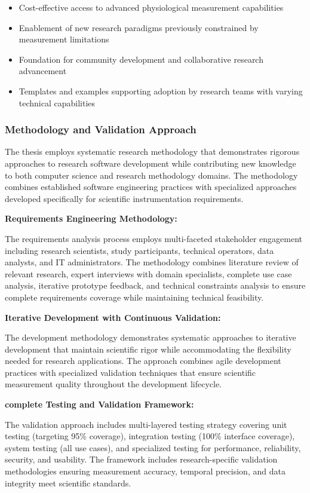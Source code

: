 \documentclass[11pt,a4paper]{article}
\begin{document}
\begin{itemize}
\item Cost-effective access to advanced physiological measurement capabilities
\item Enablement of new research paradigms previously constrained by measurement limitations
\item Foundation for community development and collaborative research advancement
\item Templates and examples supporting adoption by research teams with varying technical capabilities

\end{itemize}
\subsubsection{Methodology and Validation Approach}

The thesis employs systematic research methodology that demonstrates rigorous
approaches to research software
development while contributing new knowledge to both computer science and research
methodology domains.  The methodology
combines established software engineering practices with specialized approaches
developed specifically for scientific
instrumentation requirements.

\textbf{Requirements Engineering Methodology:}

The requirements analysis process employs multi-faceted stakeholder engagement
including research scientists, study
participants, technical operators, data analysts, and IT administrators.  The
methodology combines literature review of
relevant research, expert interviews with domain specialists, complete use case
analysis, iterative prototype
feedback, and technical constraints analysis to ensure complete requirements coverage
while maintaining technical
feasibility.

\textbf{Iterative Development with Continuous Validation:}

The development methodology demonstrates systematic approaches to iterative
development that maintain scientific rigor
while accommodating the flexibility needed for research applications.  The approach
combines agile development practices
with specialized validation techniques that ensure scientific measurement quality
throughout the development lifecycle.

\textbf{complete Testing and Validation Framework:}

The validation approach includes multi-layered testing strategy covering unit testing
(targeting 95\% coverage),
integration testing (100\% interface coverage), system testing (all use cases), and
specialized testing for performance,
reliability, security, and usability.  The framework includes research-specific
validation methodologies ensuring
measurement accuracy, temporal precision, and data integrity meet scientific
standards.
\end{document}
